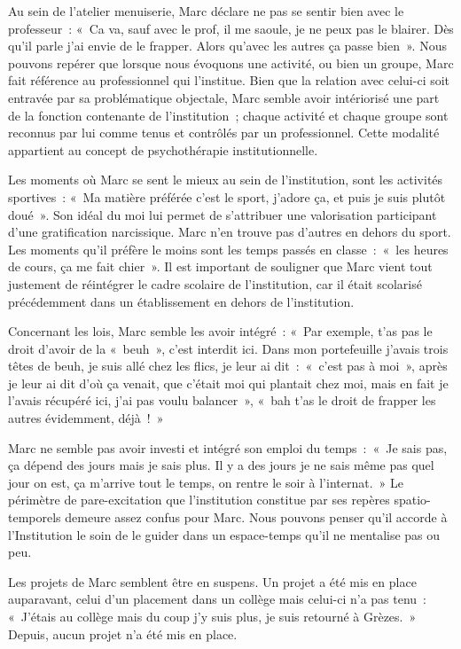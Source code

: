 \documentclass[12pt, a4paper]{book}
\begin{document}
\begin{spacing}{1.5}
Au sein de l'atelier menuiserie, Marc déclare ne pas se sentir bien avec le professeur : « Ca va, sauf avec le prof, il me saoule, je ne peux pas le blairer. Dès qu'il parle j'ai envie de le frapper. Alors qu'avec les autres ça passe bien ». Nous pouvons repérer que lorsque nous évoquons une activité, ou bien un groupe, Marc fait référence au professionnel qui l'institue. Bien que la relation avec celui-ci soit entravée par sa problématique objectale, Marc semble avoir intériorisé une part de la fonction contenante de l'institution ; chaque activité et chaque groupe sont reconnus par lui comme tenus  et contrôlés  par un professionnel. Cette modalité appartient au concept de psychothérapie institutionnelle.

Les moments où Marc se sent le mieux au sein de l'institution, sont les activités sportives : « Ma matière préférée c'est le sport, j'adore ça, et puis je suis plutôt doué ». Son idéal du moi lui permet de s'attribuer une valorisation participant d'une gratification narcissique. Marc n'en trouve pas d'autres en dehors du sport. Les moments qu'il préfère le moins sont les temps passés en classe : « les heures de cours, ça me fait chier ». Il est important de souligner que Marc vient tout justement de réintégrer le cadre scolaire de l'institution, car il était scolarisé précédemment dans un établissement en dehors de l'institution.

Concernant les lois, Marc semble les avoir intégré : « Par exemple, t'as pas le droit d'avoir de la « beuh », c'est interdit ici. Dans mon portefeuille j'avais trois têtes de beuh, je suis allé chez les flics, je leur ai dit : « c'est pas à moi », après je leur ai dit d'où ça venait, que c'était moi qui plantait chez moi, mais en fait je l'avais récupéré ici, j'ai pas voulu balancer », « bah t'as le droit de frapper les autres évidemment, déjà ! »

Marc ne semble pas avoir investi et intégré son emploi du temps : « Je sais pas, ça dépend des jours mais je sais plus. Il y a des jours je ne sais même pas quel jour on est, ça m'arrive tout le temps, on rentre le soir à l'internat. » Le périmètre de pare-excitation que l'institution constitue par ses repères spatio-temporels demeure assez confus pour Marc. Nous pouvons penser qu'il accorde à l'Institution le soin de le guider dans un espace-temps qu'il ne mentalise pas ou peu.  

Les projets de Marc semblent être en suspens. Un projet a été mis en place auparavant, celui d'un placement dans un collège mais celui-ci n'a pas tenu : « J'étais au collège mais du coup j'y suis plus, je suis retourné à Grèzes. » Depuis, aucun projet n'a été mis en place.


\end{spacing}
\end{document}

